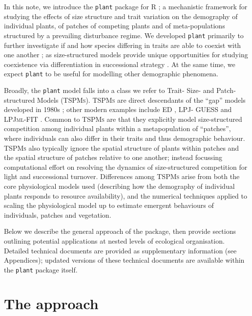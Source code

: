 \documentclass[a4paper,11pt]{article}
\newcommand{\plant}{\texttt{plant}}
\begin{document}
In this note, we introduce the {\plant} package for R \citep{R-2015};
a mechanistic framework for studying the effects of size structure and
trait variation on the demography of individual plants, of patches of
competing plants and of meta-populations structured by a prevailing
disturbance regime.
%
We developed {\plant} primarily to further investigate if and how species
differing in traits are able to coexist with one another
\citep[following ][]{Falster-2011, Falster-2015}; as size-structured models
provide unique opportunities for studying coexistence via differentiation in
successional strategy \citep[see also][]{Huston-1987, Moorcroft-2001}.
At the same time, we expect {\plant} to be useful for
modelling other demographic phenomena.

Broadly, the {\plant} model falls into a class we refer to Trait- Size- and
Patch- structured Models (\textsc{TSPMs}). \textsc{TSPMs} are direct
descendants of the ``gap'' models developed in 1980s
\citep[e.g.][]{Shugart-1980, Huston-1987, Kohyama-1993}; other modern examples
include \textsc{ED} \citep{Moorcroft-2001}, \textsc{LPJ- GUESS}
\citep{Smith-2014} and \textsc{LPJml-FIT} \citep{Sakschewski-2015}. Common to
\textsc{TSPMs} are that they explicitly model size-structured competition
among individual plants within a metapopulation of ``patches'', where
individuals can also differ in their traits and thus demographic behaviour.
\textsc {TSPMs} also typically ignore the spatial structure of plants within
patches and the spatial structure of patches relative to one another; instead
focussing computational effort on resolving the dynamics of size-structured
competition for light and successional turnover. Differences among
\textsc{TSPMs} arise from both the core physiological models used (describing
how the demography of individual plants responds to resource availability),
and the numerical techniques applied to scaling the physiological model up to
estimate emergent behaviours of individuals, patches and vegetation.

Below we describe the general approach of the package, then provide
sections outlining potential applications at nested levels of ecological organisation.
Detailed technical documents are provided as supplementary information
(see Appendices); updated versions of these technical documents are
available within the {\plant} package itself.

\section{The approach}
\end{document}
